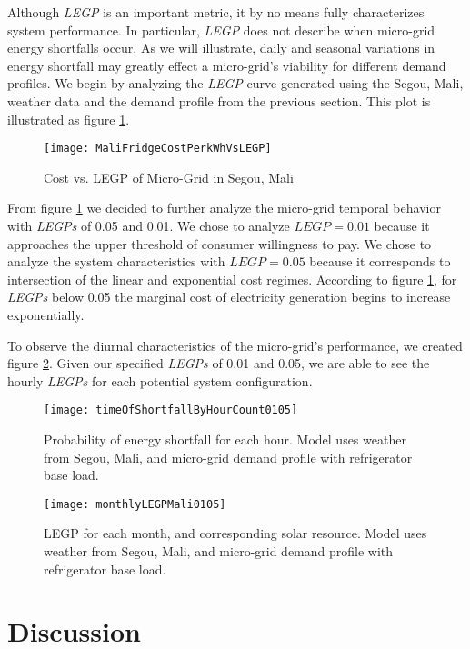 \documentclass{article}
\begin{document}

Although \emph{LEGP} is an important metric, it by no means fully characterizes system performance. 
In particular, \emph{LEGP} does not describe when micro-grid energy shortfalls occur.
As we will illustrate, daily and seasonal variations in energy shortfall may greatly effect a micro-grid's viability for different demand profiles. 
We begin by analyzing the \emph{LEGP} curve generated using the Segou, Mali, weather data and the demand profile from the previous section. 
This plot is illustrated as figure \ref{CostVLEGPMali}.

\begin{figure}[ht]  
  \centering
    \texttt{[image: MaliFridgeCostPerkWhVsLEGP]}
  \caption{Cost vs. LEGP of Micro-Grid in Segou, Mali}
  \label{CostVLEGPMali}
\end{figure}

From figure \ref{CostVLEGPMali} we decided to further analyze the micro-grid temporal behavior with \emph{LEGPs} of 0.05 and 0.01.
 We chose to analyze $LEGP = 0.01$ because it approaches the upper threshold of consumer willingness to pay.
We chose to analyze the system characteristics with $LEGP = 0.05$ because it corresponds to intersection of the linear and exponential cost regimes.
According to figure \ref{CostVLEGPMali}, for \emph{LEGPs} below 0.05 the marginal cost of electricity generation begins to increase exponentially.  

To observe the diurnal characteristics of the micro-grid's performance, we created figure \ref{hourlyLEGP}. Given our specified \emph{LEGPs} of 0.01 and 0.05, we are able to see the hourly \emph{LEGPs} for each potential system configuration.

\begin{figure}[ht]
\centering
\texttt{[image: timeOfShortfallByHourCount0105]}
\caption{Probability of energy shortfall for each hour. Model uses weather from Segou, Mali, and micro-grid demand profile with refrigerator base load.}
\label{hourlyLEGP}
\end{figure} 


\begin{figure}[ht]
\centering
\texttt{[image: monthlyLEGPMali0105]}
\caption{LEGP for each month, and corresponding solar resource. Model uses weather from Segou, Mali, and micro-grid demand profile with refrigerator base load.}
\label{monthlyLEGP}
\end{figure} 





\section{Discussion}
\end{document}
